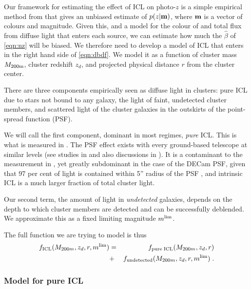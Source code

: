 {Our framework for estimating the effect of ICL on photo-$z$ is a simple empirical method from \citet{2016arXiv161001160G} that gives an unbiased estimate of $p(z|{\bf m})$, where ${\bf m}$ is a vector of colours and magnitude. Given this, and a model for the colour of and total flux from diffuse light that enters each source, we can estimate how much the $\hat{\beta}$ of \ref{eqn:nz} will be biased. We therefore need to develop a model of ICL that enters in the right hand side of \ref{eqn:dbdf}. We model it as a function of cluster mass $M_{\rm 200m}$, cluster redshift $z_{d}$, and projected physical distance $r$ from the cluster center.

There are three components empirically seen as diffuse light in clusters: pure ICL due to stars not bound to any galaxy, the light of faint, undetected cluster members, and scattered light of the cluster galaxies in the outskirts of the point-spread function (PSF). 

We will call the first component, dominant in most regimes, \emph{pure} ICL. This is what is measured in \citet{icl}. The PSF effect exists with every ground-based telescope at similar levels (see studies in \citealt{1969A&A.....3..455M, 1971PASP...83..199K, 1996PASP..108..699R,2007ApJ...666..663B, 2014A&A...567A..97S} and also discussions in \citealt{icl}). It is a contaminant to the measurement in \citet{icl}, yet greatly subdominant in the case of the DECam PSF, given that 97 per cent of light is contained within 5'' radius of the PSF \citep[][their section 4]{icl}, and intrinsic ICL is a much larger fraction of total cluster light.

Our second term, the amount of light in \emph{undetected} galaxies, depends on the depth to which cluster members are detected and can be successfully deblended. We approximate this as a fixed limiting magnitude $m^{\rm lim}$.

The full function we are trying to model is thus
\begin{eqnarray}
\label{eqn:fmodel}
f_{\rm ICL}(M_{200m}, z_{d}, r, m^{\rm lim}) &=& f_{\rm pure\; ICL}(M_{200m}, z_{d}, r) \nonumber \\ &+& f_{\rm undetected}(M_{200m}, z_{d}, r, m^{\rm lim}) \; . \nonumber \\
\end{eqnarray}

\subsubsection{Model for pure ICL}

}
